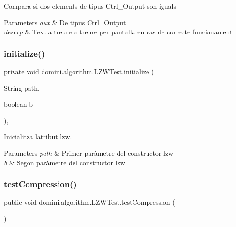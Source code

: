 Compara si dos elements de tipus Ctrl\+\_\+\+Output son iguals. 


\begin{DoxyParams}{Parameters}
{\em aux} & De tipus Ctrl\+\_\+\+Output \\
\hline
{\em descrp} & Text a treure a treure per pantalla en cas de correcte funcionament \\
\hline
\end{DoxyParams}
\mbox{\label{classdomini_1_1algorithm_1_1LZWTest_acf4cac88aafa2144dc8ce3a80453fa90}} 
\subsubsection{\texorpdfstring{initialize()}{initialize()}}
{\footnotesize\ttfamily private void domini.\+algorithm.\+L\+Z\+W\+Test.\+initialize (\begin{DoxyParamCaption}\item[{String}]{path,  }\item[{boolean}]{b }\end{DoxyParamCaption})\hspace{0.3cm}{\ttfamily [inline]}, {\ttfamily [private]}}



Inicialitza l\textquotesingle{}atribut lzw. 


\begin{DoxyParams}{Parameters}
{\em path} & Primer paràmetre del constructor lzw \\
\hline
{\em b} & Segon paràmetre del constructor lzw \\
\hline
\end{DoxyParams}
\mbox{\label{classdomini_1_1algorithm_1_1LZWTest_ae43f1a846dc9672b04c707314006a878}} 
\subsubsection{\texorpdfstring{test\+Compression()}{testCompression()}}
{\footnotesize\ttfamily public void domini.\+algorithm.\+L\+Z\+W\+Test.\+test\+Compression (\begin{DoxyParamCaption}{ }\end{DoxyParamCaption})\hspace{0.3cm}{\ttfamily [inline]}}



